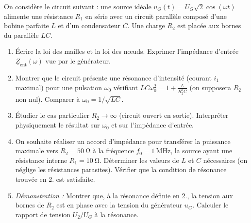 \documentclass[11pt]{article}
\begin{document}
\begin{exercice}
On considère le circuit suivant : une source idéale $u_G(t) = U_G\sqrt{2}\cos(\omega t)$ alimente une résistance $R_1$ en série avec un circuit parallèle composé d'une bobine parfaite $L$ et d'un condensateur $C$. Une charge $R_2$ est placée aux bornes du parallèle $LC$.
\begin{enumerate}
    \item Écrire la loi des mailles et la loi des nœuds. Exprimer l'impédance d'entrée $\underline{Z}_{\text{ent}}(\omega)$ vue par le générateur.
    \item Montrer que le circuit présente une résonance d'intensité (courant $i_1$ maximal) pour une pulsation $\omega_0$ vérifiant $L C \omega_0^2 = 1 + \frac{L}{R_2^2 C}$ (on supposera $R_2$ non nul). Comparer à $\omega_0 = 1/\sqrt{LC}$.
    \item Étudier le cas particulier $R_2 \to \infty$ (circuit ouvert en sortie). Interpréter physiquement le résultat sur $\omega_0$ et sur l'impédance d'entrée.
    \item On souhaite réaliser un accord d'impédance pour transférer la puissance maximale vers $R_2 = \SI{50}{\ohm}$ à la fréquence $f_0 = \SI{1}{\mega\hertz}$, la source ayant une résistance interne $R_1 = \SI{10}{\ohm}$. Déterminer les valeurs de $L$ et $C$ nécessaires (on néglige les résistances parasites). Vérifier que la condition de résonance trouvée en 2. est satisfaite.
    \item \textit{Démonstration :} Montrer que, à la résonance définie en 2., la tension aux bornes de $R_2$ est en phase avec la tension du générateur $u_G$. Calculer le rapport de tension $U_2/U_G$ à la résonance.
\end{enumerate}
\end{exercice}
\end{document}
